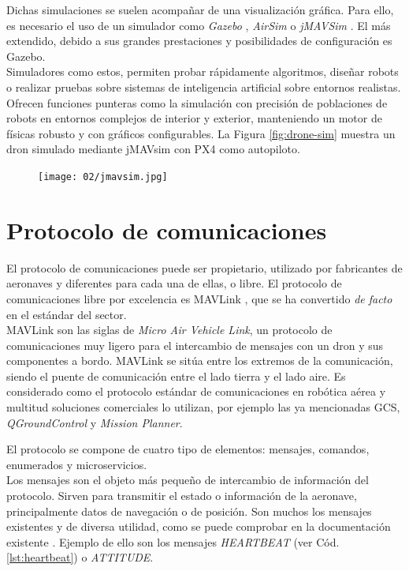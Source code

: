 \documentclass[../main.tex]{subfiles}
\begin{document}
Dichas simulaciones se suelen acompañar de una visualización gráfica. Para ello, es necesario el uso de un simulador como \emph{Gazebo} \cite{gazebo}, \emph{AirSim} \cite{airsim} o \emph{jMAVSim} \cite{jmavsim}. El más extendido, debido a sus grandes prestaciones y posibilidades de configuración es Gazebo. \\
Simuladores como estos, permiten probar rápidamente algoritmos, diseñar robots o realizar pruebas sobre sistemas de inteligencia artificial sobre entornos realistas. Ofrecen funciones punteras como la simulación con precisión de poblaciones de robots en entornos complejos de interior y exterior, manteniendo un motor de físicas robusto y con gráficos configurables.
La Figura \ref{fig:drone-sim} muestra un dron simulado mediante jMAVsim con PX4 como autopiloto. 

\begin{figure}[ht]
 	{\texttt{[image: 02/jmavsim.jpg]}}
\end{figure}

\section{Protocolo de comunicaciones} \label{section:herram-protocolo}
El protocolo de comunicaciones puede ser propietario, utilizado por fabricantes de aeronaves y diferentes para cada una de ellas, o libre. El protocolo de comunicaciones libre por excelencia es MAVLink \cite{mavlink}, que se ha convertido \emph{de facto} en el estándar del sector. \\
MAVLink son las siglas de \emph{Micro Air Vehicle Link}, un protocolo de comunicaciones muy ligero para el intercambio de mensajes con un dron y sus componentes a bordo. MAVLink se sitúa entre los extremos de la comunicación, siendo el puente de comunicación entre el lado tierra y el lado aire. Es considerado como el protocolo estándar de comunicaciones en robótica aérea y multitud soluciones comerciales lo utilizan, por ejemplo las ya mencionadas GCS, \emph{QGroundControl} y \emph{Mission Planner}.

El protocolo se compone de cuatro tipo de elementos: mensajes, comandos, enumerados y microservicios. \\
Los mensajes son el objeto más pequeño de intercambio de información del protocolo. Sirven para transmitir el estado o información de la aeronave, principalmente datos de navegación o de posición.
Son muchos los mensajes existentes y de diversa utilidad, como se puede comprobar en la documentación existente \cite{mavlink-msg}. Ejemplo de ello son los mensajes \emph{HEARTBEAT} (ver Cód. \ref{lst:heartbeat}) o \emph{ATTITUDE}.
\end{document}
